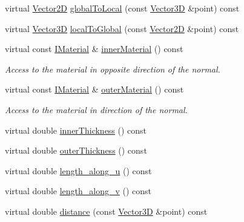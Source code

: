 \begin{DoxyCompactItemize}
\item 
virtual \hyperlink{class_d_d_surfaces_1_1_vector2_d}{Vector2D} \hyperlink{class_d_d4hep_1_1_d_d_rec_1_1_vol_surface_aa4251b5a2eb3f18a84e7b369929b6ba3}{globalToLocal} (const \hyperlink{class_d_d_surfaces_1_1_vector3_d}{Vector3D} \&point) const 
\item 
virtual \hyperlink{class_d_d_surfaces_1_1_vector3_d}{Vector3D} \hyperlink{class_d_d4hep_1_1_d_d_rec_1_1_vol_surface_a784a48baa6fa269f2c626acce19f1154}{localToGlobal} (const \hyperlink{class_d_d_surfaces_1_1_vector2_d}{Vector2D} \&point) const 
\item 
virtual const \hyperlink{class_d_d_surfaces_1_1_i_material}{IMaterial} \& \hyperlink{class_d_d4hep_1_1_d_d_rec_1_1_vol_surface_a9f25046b9bac451dd240aa7b020d704a}{innerMaterial} () const 
\begin{DoxyCompactList}\small\item\em Access to the material in opposite direction of the normal. \item\end{DoxyCompactList}\item 
virtual const \hyperlink{class_d_d_surfaces_1_1_i_material}{IMaterial} \& \hyperlink{class_d_d4hep_1_1_d_d_rec_1_1_vol_surface_a65195963a086380a08fb14762108bad2}{outerMaterial} () const 
\begin{DoxyCompactList}\small\item\em Access to the material in direction of the normal. \item\end{DoxyCompactList}\item 
virtual double \hyperlink{class_d_d4hep_1_1_d_d_rec_1_1_vol_surface_a21b75812c52fa387e58ce0ac7a25aaca}{innerThickness} () const 
\item 
virtual double \hyperlink{class_d_d4hep_1_1_d_d_rec_1_1_vol_surface_abf78c6b50d2959a7e1f50ed36fc759f6}{outerThickness} () const 
\item 
virtual double \hyperlink{class_d_d4hep_1_1_d_d_rec_1_1_vol_surface_ab4c1720db7c0170646211f26855ee38e}{length\_\-along\_\-u} () const 
\item 
virtual double \hyperlink{class_d_d4hep_1_1_d_d_rec_1_1_vol_surface_acf14d37efeb8c9baaeba295f9e0fa38f}{length\_\-along\_\-v} () const 
\item 
virtual double \hyperlink{class_d_d4hep_1_1_d_d_rec_1_1_vol_surface_aeabe1f73edf8b917bede275fb8f2d4a3}{distance} (const \hyperlink{class_d_d_surfaces_1_1_vector3_d}{Vector3D} \&point) const 
\item 

\end{DoxyCompactItemize}
